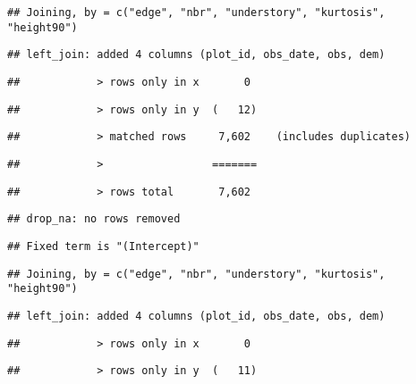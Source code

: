 \documentclass[
]{article}
\begin{document}
\begin{verbatim}
## Joining, by = c("edge", "nbr", "understory", "kurtosis", "height90")
\end{verbatim}

\begin{verbatim}
## left_join: added 4 columns (plot_id, obs_date, obs, dem)
\end{verbatim}

\begin{verbatim}
##            > rows only in x       0
\end{verbatim}

\begin{verbatim}
##            > rows only in y  (   12)
\end{verbatim}

\begin{verbatim}
##            > matched rows     7,602    (includes duplicates)
\end{verbatim}

\begin{verbatim}
##            >                 =======
\end{verbatim}

\begin{verbatim}
##            > rows total       7,602
\end{verbatim}

\begin{verbatim}
## drop_na: no rows removed
\end{verbatim}

\begin{verbatim}
## Fixed term is "(Intercept)"
\end{verbatim}

\begin{verbatim}
## Joining, by = c("edge", "nbr", "understory", "kurtosis", "height90")
\end{verbatim}

\begin{verbatim}
## left_join: added 4 columns (plot_id, obs_date, obs, dem)
\end{verbatim}

\begin{verbatim}
##            > rows only in x       0
\end{verbatim}

\begin{verbatim}
##            > rows only in y  (   11)
\end{verbatim}
\end{document}
